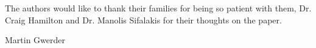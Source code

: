 \documentclass[12pt,journal,compsoc]{IEEEtran}
\begin{document}
The authors would like to thank their families for being so patient with them, Dr. Craig Hamilton and Dr. Manolis Sifalakis for their thoughts on the paper.


\ifCLASSOPTIONcaptionsoff
  \newpage
\fi







%
%
%
%

% 
\ifCLASSOPTIONpeerreview
\else
\vfill
\begin{IEEEbiography}{Martin Gwerder}

\end{IEEEbiography}
\fi
\end{document}
